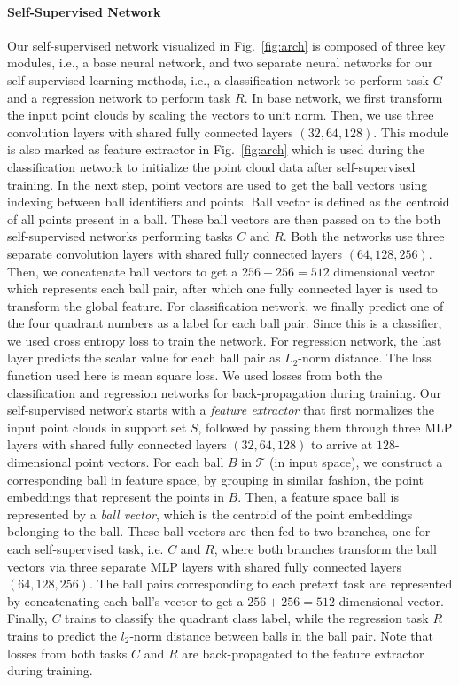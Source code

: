 \documentclass{article}
\newcommand{\mT}{\mathcal{T}}
\begin{document}
\paragraph{Self-Supervised Network}
Our self-supervised network visualized in Fig.~\ref{fig:arch} is composed of three key modules, i.e., a base neural network, and two separate neural networks for our self-supervised learning methods, i.e., a classification network to perform task $C$ and a regression network to perform task $R$. In base network, we first transform the input point clouds by scaling the vectors to unit norm. Then, we use three convolution layers with shared fully connected layers $(32,64,128)$. This module is also marked as feature extractor in Fig.~\ref{fig:arch} which is used during the classification network to initialize the point cloud data after self-supervised training. In the next step, point vectors are used to get the ball vectors using indexing between ball identifiers and points. Ball vector is defined as the centroid of all points present in a ball. These ball vectors are then passed on to the both self-supervised networks performing tasks $C$ and $R$. Both the networks use three separate convolution layers with shared fully connected layers $(64,128,256)$. Then, we concatenate ball vectors to get a $256+256=512$ dimensional vector which represents each ball pair, after which one fully connected layer is used to transform the global feature. For classification network, we finally predict one of the four quadrant numbers as a label for each ball pair. Since this is a classifier, we used cross entropy loss to train the network. For regression network, the last layer predicts the scalar value for each ball pair as $L_{2}$-norm distance. The loss function used here is mean square loss. We used losses from both the classification and regression networks for back-propagation during training. \fi
Our self-supervised network starts with a \emph{feature extractor} that first normalizes the input point clouds in support set $S$, followed by passing them through three MLP layers with shared fully connected layers $(32,64,128)$ to arrive at $128$-dimensional point vectors. For each ball $B$ in $\mT$ (in input space), we construct a corresponding ball in feature space, by grouping in similar fashion, the point embeddings that represent the points in $B$. Then, a feature space ball is represented by a \emph{ball vector}, which is the centroid of the point embeddings belonging to the ball. These ball vectors are then fed to two branches, one for each self-supervised task, i.e. $C$ and $R$, where both branches transform the ball vectors via three separate MLP layers with shared fully connected layers $(64,128,256)$. The ball pairs corresponding to each pretext task are represented by concatenating each ball's vector to get a $256+256=512$ dimensional vector. Finally, $C$ trains to classify the quadrant class label, while the regression task $R$ trains to predict the $l_2$-norm distance between balls in the ball pair. Note that losses from both tasks $C$ and $R$ are back-propagated to the feature extractor during training.
\end{document}
